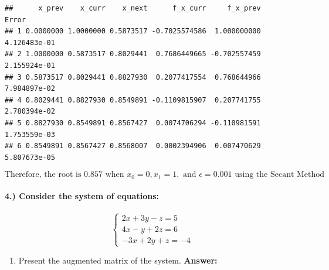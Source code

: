\documentclass[
]{article}
\newenvironment{Shaded}{\begin{snugshade}}{\end{snugshade}}
\newcommand{\AttributeTok}[1]{\textcolor[rgb]{0.13,0.29,0.53}{#1}}
\newcommand{\ControlFlowTok}[1]{\textcolor[rgb]{0.13,0.29,0.53}{\textbf{#1}}}
\newcommand{\DecValTok}[1]{\textcolor[rgb]{0.00,0.00,0.81}{#1}}
\newcommand{\FloatTok}[1]{\textcolor[rgb]{0.00,0.00,0.81}{#1}}
\newcommand{\FunctionTok}[1]{\textcolor[rgb]{0.13,0.29,0.53}{\textbf{#1}}}
\newcommand{\NormalTok}[1]{#1}
\newcommand{\OtherTok}[1]{\textcolor[rgb]{0.56,0.35,0.01}{#1}}
\newcommand{\SpecialCharTok}[1]{\textcolor[rgb]{0.81,0.36,0.00}{\textbf{#1}}}
\providecommand{\tightlist}{%
  \setlength{\itemsep}{0pt}\setlength{\parskip}{0pt}}
\begin{document}
\begin{Shaded}
\end{Shaded}

\begin{verbatim}
##      x_prev    x_curr    x_next      f_x_curr     f_x_prev        Error
## 1 0.0000000 1.0000000 0.5873517 -0.7025574586  1.000000000 4.126483e-01
## 2 1.0000000 0.5873517 0.8029441  0.7686449665 -0.702557459 2.155924e-01
## 3 0.5873517 0.8029441 0.8827930  0.2077417554  0.768644966 7.984897e-02
## 4 0.8029441 0.8827930 0.8549891 -0.1109815907  0.207741755 2.780394e-02
## 5 0.8827930 0.8549891 0.8567427  0.0074706294 -0.110981591 1.753559e-03
## 6 0.8549891 0.8567427 0.8568007  0.0002394906  0.007470629 5.807673e-05
\end{verbatim}

\[
\boxed{\text{Therefore, the root is } 0.857 \text{ when } x_0=0, x_1=1, \text{ and } \epsilon = 0.001 \text{ using the Secant Method}}
\]

\paragraph{4.) Consider the system of
equations:}\label{consider-the-system-of-equations}

\[
\begin{cases}
2x + 3y - z = 5 \\
4x - y + 2z = 6 \\
-3x + 2y + z = -4
\end{cases}
\]

\begin{enumerate}
\def\labelenumi{\alph{enumi}.}
\tightlist
\item
  Present the augmented matrix of the system. \textbf{Answer:}
\end{enumerate}
\end{document}
